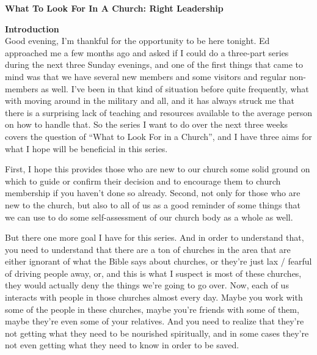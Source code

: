 \documentclass[letterpaper, 12pt]{article}
\begin{document}
    \thispagestyle{empty}

    \begin{center}

        \textbf{\large{What To Look For In A Church: Right Leadership}}

    \end{center}

    \noindent \textbf{Introduction} \\

    Good evening, I'm thankful for the opportunity to be here tonight.
    Ed approached me a few months ago and asked if I could do a
    three-part series during the next three Sunday evenings, and one of
    the first things that came to mind was that we have several new
    members and some visitors and regular non-members as well. I've been
    in that kind of situation before quite frequently, what with moving
    around in the military and all, and it has always struck me that
    there is a surprising lack of teaching and resources available to
    the average person on how to handle that. So the series I want to do
    over the next three weeks covers the question of ``What to Look For
    in a Church'', and I have three aims for what I hope will be
    beneficial in this series. 

    First, I hope this provides those who are new to our church some
    solid ground on which to guide or confirm their decision and to
    encourage them to church membership if you haven't done so already.
    Second, not only for those who are new to the church, but also to
    all of us as a good reminder of some things that we can use to do
    some self-assessment of our church body as a whole as well. 

    But there one more goal I have for this series. And in order to
    understand that, you need to understand that there are a ton of
    churches in the area that are either ignorant of what the Bible says
    about churches, or they're just lax / fearful of driving people
    away, or, and this is what I suspect is most of these churches, they
    would actually deny the things we're going to go over. Now, each of
    us interacts with people in those churches almost every day. Maybe
    you work with some of the people in these churches, maybe you're
    friends with some of them, maybe they're even some of your
    relatives. And you need to realize that they're not getting what
    they need to be nourished spiritually, and in some cases they're not
    even getting what they need to know in order to be saved.
\end{document}
